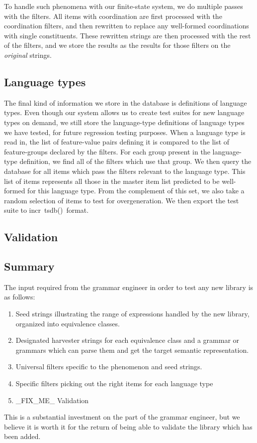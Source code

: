 \documentclass[11pt]{article}
\newcommand{\itsdb}{\mbox{\sf \lbrack incr tsdb()\rbrack}}
\begin{document}
To handle such phenomena with our finite-state system, we do multiple
passes with the filters.  All items with coordination are first processed
with the coordination filters, and then rewritten to replace any
well-formed coordinations with single constituents.  These rewritten
strings are then processed with the rest of the filters, and we store
the results as the results for those filters on the {\it original}
strings.

\subsection{Language types}

The final kind of information we store in the database is definitions
of language types.  Even though our system allows us to create test
suites for new language types on demand, we still store the
language-type definitions of language types we have tested, for future
regression testing purposes.  When a language type is read in, the
list of feature-value pairs defining it is compared to the list of
feature-groups declared by the filters.  For each group present in the
language-type definition, we find all of the filters which use that
group.  We then query the database for all items which pass the
filters relevant to the language type.  This list of items represents
all those in the master item list predicted to be well-formed for
this language type.  From the complement of this set, we also take
a random selection of items to test for overgeneration.  We then export
the test suite to \itsdb\ format.

\subsection{Validation}

\subsection{Summary}

The input required from the grammar engineer in order to
test any new library is as follows:

\begin{enumerate}
\item Seed strings illustrating the range of expressions
handled by the new library, organized into equivalence
classes.
\item Designated harvester strings for each equivalence class
and a grammar or grammars which can parse them and get
the target semantic representation.
\item Universal filters specific to the phenomenon and
seed strings.
\item Specific filters picking out the right items for
each language type
\item \_FIX\_ME\_ Validation
\end{enumerate}
%
This is a substantial investment on the part of the grammar
engineer, but we believe it is worth it for the return of
being able to validate the library which has been added.
\end{document}
